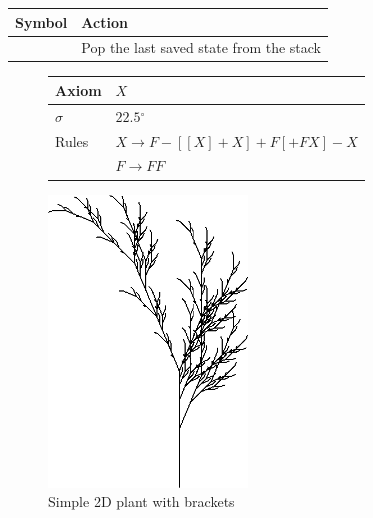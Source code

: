 \documentclass[11pt,a4paper]{article}
\newcommand{\degree}{\ensuremath{^\circ}}
\begin{document}
\begin{center}
\begin{tabular}{c | l}
Symbol & Action \\ \hline
[ & Push the current state to the stack \\
] & Pop the last saved state from the stack \\
\end{tabular}
\end{center}

\begin{figure}[htb]
  \centering
  \begin{minipage}[c]{0.65\textwidth}
    \centering
    \begin{tabular}{l l}
Axiom & $X$ \\ \hline
$\sigma$ & $22.5$\degree \\ \hline
Rules & $X \rightarrow F-[[X]+X]+F[+FX]-X$ \\
& $F \rightarrow FF$ \\
	\end{tabular}
  \end{minipage}
  \begin{minipage}[c]{0.33\textwidth}
    \includegraphics[width=\textwidth]{tree.png}
  \end{minipage}
  \caption{Simple 2D plant with brackets}
  \label{fig:tree}
\end{figure}
\end{document}
